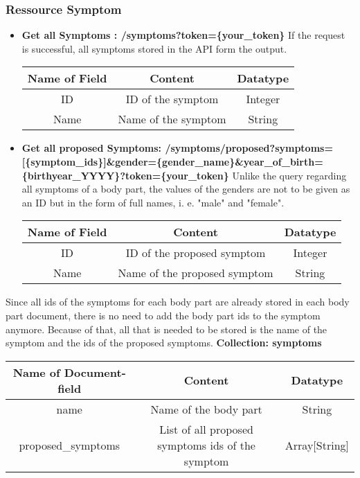 \subsubsection{Ressource Symptom}
\begin{itemize}
	\item \textbf{Get all Symptoms :  /symptoms?token=\{your\_token\}}
	\newline		
	If the request is successful, all symptoms stored in the API form the output.
	\begin{center}
		\begin{tabular}{ | c| c| c | } 
			\hline
			Name of Field& Content & Datatype \\ 
			\hline
			ID & ID of the symptom & Integer \\ 
			\hline
			Name & Name of the symptom & String \\ 
			\hline
		\end{tabular}
	\end{center}
	
	\item \textbf{Get all proposed Symptoms:  /symptoms/proposed?symptoms=[\{symptom\_ids\}]\newline\&gender=\{gender\_name\}\&year\_of\_birth=\{birthyear\_YYYY\}?token=\{your\_token\}}
	\newline
	Unlike the query regarding all symptoms of a body part, the values of the genders are not to be given as an ID but in the form of full names, i. e. "male" and "female".
	\begin{center}
		\begin{tabular}{ | c| c| c | } 
			\hline
			Name of Field& Content & Datatype \\ 
			\hline
			ID & ID of the proposed symptom & Integer \\ 
			\hline
			Name & Name of the proposed symptom & String \\ 
			\hline
		\end{tabular}
	\end{center}
\end{itemize}
Since all ids of the symptoms for each body part are already stored in each body part document, there is no need to add the body part ids to the symptom anymore. Because of that, all that is needed to be stored is the name of the symptom and the ids of the proposed symptoms.
\newline
\textbf{Collection: symptoms}
\begin{center}
	\begin{tabular}{ | c| c| c | } 
		\hline
		Name of Document-field& Content & Datatype \\ 
		\hline
		name & Name of the body part & String \\ 
		\hline
		proposed\_symptoms & List of all proposed symptoms ids of the symptom  & Array[String] \\ 
		\hline
	\end{tabular}
\end{center}
